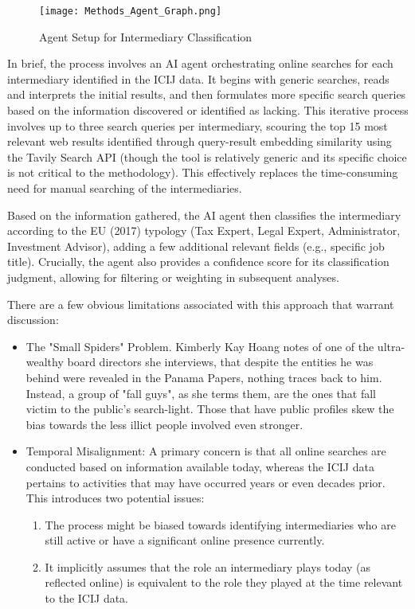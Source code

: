 \begin{figure}[htbp]
    \centering
    \texttt{[image: Methods\_Agent\_Graph.png]} %
    \caption{Agent Setup for Intermediary Classification}
    \label{fig:agent_loop_placeholder}
\end{figure}

In brief, the process involves an AI agent orchestrating online searches for each intermediary identified in the ICIJ data. It begins with generic searches, reads and interprets the initial results, and then formulates more specific search queries based on the information discovered or identified as lacking. This iterative process involves up to three search queries per intermediary, scouring the top 15 most relevant web results identified through query-result embedding similarity using the Tavily Search API (though the tool is relatively generic and its specific choice is not critical to the methodology). This effectively replaces the time-consuming need for manual searching of the intermediaries.

Based on the information gathered, the AI agent then classifies the intermediary according to the EU (2017) typology (Tax Expert, Legal Expert, Administrator, Investment Advisor), adding a few additional relevant fields (e.g., specific job title). Crucially, the agent also provides a confidence score for its classification judgment, allowing for filtering or weighting in subsequent analyses.


There are a few obvious limitations associated with this approach that warrant discussion:
\begin{itemize}
    \item The "Small Spiders" Problem. Kimberly Kay Hoang notes of one of the ultra-wealthy board directors she interviews, that despite the entities he was behind were revealed in the Panama Papers, nothing traces back to him. Instead, a group of "fall guys", as she terms them, are the ones that fall victim to the public's search-light. Those that have public profiles skew the bias towards the less illict people involved even stronger.
    \item Temporal Misalignment: A primary concern is that all online searches are conducted based on information available today, whereas the ICIJ data pertains to activities that may have occurred years or even decades prior. This introduces two potential issues:
    \begin{enumerate}
        \item The process might be biased towards identifying intermediaries who are still active or have a significant online presence currently.
        \item It implicitly assumes that the role an intermediary plays today (as reflected online) is equivalent to the role they played at the time relevant to the ICIJ data.
    \end{enumerate}
\end{itemize}

